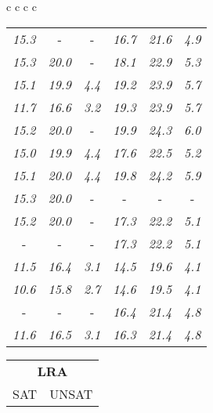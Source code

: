 \documentclass[sigplan,screen]{acmart}
\makeatletter
\newcommand{\ccell}[3][]{%
  \kern-\fboxsep
  \if\relax\detokenize{#1}\relax
    \expandafter\@firstoftwo
  \else
    \expandafter\@secondoftwo
  \fi
  {\colorbox{#2}}%
  {\colorbox[#1]{#2}}%
  {#3}\kern-\fboxsep
}
\makeatother
\begin{document}
\begin{table*}
\begin{tabular}{c c c c}
\begin{tabular}{c c c c c c}
      \rule{0pt}{4ex}    
      
      \textit{15.3} &  \ccell[gray]{0.9}{\textit{20.1}} &  \ccell[gray]{0.9}{\textit{4.5}} & \textit{16.7} & \textit{21.6} & \textit{4.9} \\
      \textit{15.3} & \textit{20.0} &  \ccell[gray]{0.9}{\textit{4.5}} & \textit{18.1} & \textit{22.9} & \textit{5.3} \\
      \textit{15.1} & \textit{19.9} & \textit{4.4} & \textit{19.2} & \textit{23.9} & \textit{5.7} \\
      \textit{11.7} & \textit{16.6} & \textit{3.2} & \textit{19.3} & \textit{23.9} & \textit{5.7} \\
      \textit{15.2} & \textit{20.0} &  \ccell[gray]{0.9}{\textit{4.5}} & \textit{19.9} & \textit{24.3} & \textit{6.0} \\
      \textit{15.0} & \textit{19.9} & \textit{4.4} & \textit{17.6} & \textit{22.5} & \textit{5.2} \\
      \textit{15.1} & \textit{20.0} & \textit{4.4} & \textit{19.8} & \textit{24.2} & \textit{5.9} \\
      \textit{15.3} & \textit{20.0} &  \ccell[gray]{0.9}{\textit{4.5}} &  \ccell[gray]{0.9}{\textit{20.2}} &  \ccell[gray]{0.9}{\textit{24.4}} &  \ccell[gray]{0.9}{\textit{6.1}} \\
      \textit{15.2} & \textit{20.0} &  \ccell[gray]{0.9}{\textit{4.5}} & \textit{17.3} & \textit{22.2} & \textit{5.1} \\
       \ccell[gray]{0.9}{\textit{15.4}} &  \ccell[gray]{0.9}{\textit{20.1}} &  \ccell[gray]{0.9}{\textit{4.5}} & \textit{17.3} & \textit{22.2} & \textit{5.1} \\
      \textit{11.5} & \textit{16.4} & \textit{3.1} & \textit{14.5} & \textit{19.6} & \textit{4.1} \\
      \textit{10.6} & \textit{15.8} & \textit{2.7} & \textit{14.6} & \textit{19.5} & \textit{4.1} \\
       \ccell[gray]{0.9}{\textit{15.4}} &  \ccell[gray]{0.9}{\textit{20.1}} &  \ccell[gray]{0.9}{\textit{4.5}} & \textit{16.4} & \textit{21.4} & \textit{4.8} \\
      \textit{11.6} & \textit{16.5} & \textit{3.1} & \textit{16.3} & \textit{21.4} & \textit{4.8} \\
\end{tabular}
\begin{tabular}{c c c c c c}
  \multicolumn{6}{c}{\textbf{LRA}} \\
   \cline{2-5}
  \multicolumn{3}{c}{SAT} & \multicolumn{3}{c}{UNSAT} \\

\end{tabular}
\end{tabular}
\end{table*}
\end{document}
